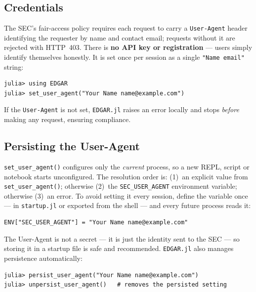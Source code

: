 \documentclass[11pt,a4paper]{report}
\begin{document}
\begin{subappendices}
\section{Credentials}\label{sec:edgar-credentials}\label{sec:ua}

The SEC's fair-access policy requires each request to carry a \texttt{User-Agent} header identifying the
requester by name and contact email; requests without it are rejected with HTTP~403. There is \textbf{no API
key or registration} --- users simply identify themselves honestly. It is set once per session as a single
\texttt{"Name email"} string:

\begin{lstlisting}
julia> using EDGAR
julia> set_user_agent("Your Name name@example.com")
\end{lstlisting}

\noindent If the \texttt{User-Agent} is not set, \texttt{EDGAR.jl} raises an error locally and stops
\emph{before} making any request, ensuring compliance.

\subsection{Persisting the User-Agent}
\texttt{set\_user\_agent()} configures only the \emph{current} process, so a new REPL, script or notebook
starts unconfigured. The resolution order is: (1)~an explicit value from \texttt{set\_user\_agent()};
otherwise (2)~the \texttt{SEC\_USER\_AGENT} environment variable; otherwise (3)~an error. To avoid setting it
every session, define the variable once --- in \texttt{startup.jl} or exported from the shell --- and every
future process reads it:

\begin{lstlisting}
ENV["SEC_USER_AGENT"] = "Your Name name@example.com"
\end{lstlisting}

\noindent The User-Agent is not a secret --- it is just the identity sent to the SEC --- so storing it in a
startup file is safe and recommended. \texttt{EDGAR.jl} also manages persistence automatically:

\begin{lstlisting}
julia> persist_user_agent("Your Name name@example.com")
julia> unpersist_user_agent()   # removes the persisted setting
\end{lstlisting}


\end{subappendices}
\end{document}
